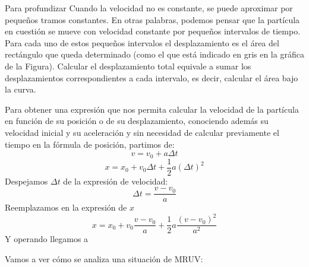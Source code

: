 \begin{mybox}{Para profundizar}
Cuando la velocidad no es constante, se puede aproximar por pequeños tramos constantes. En otras palabras, podemos pensar que la partícula en cuestión se mueve con velocidad constante por pequeños intervalos de tiempo. Para cada uno de estos pequeños intervalos el desplazamiento es el área del rectángulo que queda determinado (como el que está indicado en gris en la gráfica de la Figura). Calcular el desplazamiento total equivale a sumar los desplazamientos correspondientes a cada intervalo, es decir, calcular el área bajo la curva.
\end{mybox}



Para obtener una expresión que nos permita calcular la velocidad de la partícula en función de su posición o de su desplazamiento, conociendo además su velocidad inicial y su aceleración y sin necesidad de calcular previamente el tiempo en la fórmula de posición, partimos de:
$$v = v_0 + a \Delta t$$
$$x = x_0 + v_0 \Delta t + \frac{1}{2}a(\Delta t)^2$$
Despejamos $\Delta t$ de la expresión de velocidad:
$$\Delta t = \frac{v - v_0}{a}$$
Reemplazamos en la expresión de $x$
$$x = x_0 + v_0 \frac{v - v_0}{a} + \frac{1}{2} a \frac{(v - v_0)^2}{a^2}$$
Y operando llegamos a 
\begin{center}
{\color{Magenta}  }
\end{center}

Vamos a ver cómo se analiza una situación de MRUV:

